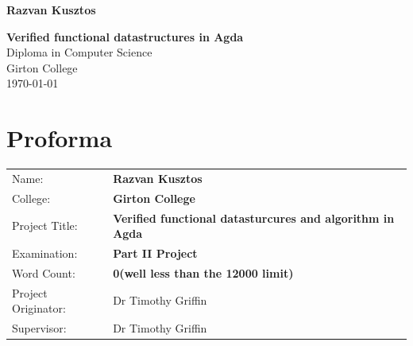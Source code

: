 \documentclass[12pt,twoside,notitlepage]{report}
\begin{document}





\pagestyle{empty}

\hfill{\LARGE \bf Razvan Kusztos}

\vspace*{60mm}
\begin{center}
\Huge
{\bf Verified functional datastructures in Agda} \\
\vspace*{5mm}
Diploma in Computer Science \\
\vspace*{5mm}
Girton College \\
\vspace*{5mm}
\today  %
\end{center}

\cleardoublepage


\linespread{1.5}



\setcounter{page}{1}
\pagestyle{plain}

\chapter*{Proforma}

{\large
\begin{tabular}{ll}
Name:               & \bf Razvan Kusztos                       \\
College:            & \bf Girton College                     \\
Project Title:      & \bf Verified functional datasturcures and algorithm in Agda \\
Examination:        & \bf Part II Project        \\
Word Count:         & \bf 0\footnotemark[1]
(well less than the 12000 limit) \\
Project Originator: & Dr Timothy Griffin                    \\
Supervisor:         & Dr Timothy Griffin                    \\
\end{tabular}
}
\end{document}
